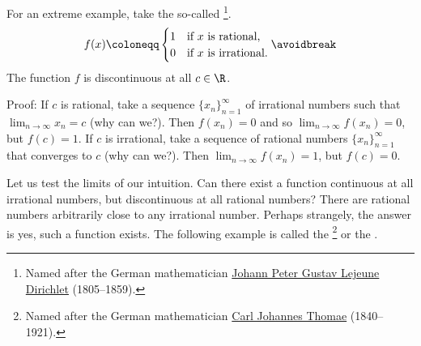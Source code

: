 \begin{example}
For an extreme example, take the so-called
\emph{}\footnote{Named after the German
mathematician
\href{https://en.wikipedia.org/wiki/Peter_Gustav_Lejeune_Dirichlet}{Johann Peter Gustav Lejeune
Dirichlet}
(1805--1859).}.
\begin{equation*}
f(x) \coloneqq
\begin{cases}
1 & \text{if } x \text{ is rational,} \\
0 & \text{if } x \text{ is irrational.}
\end{cases}
\avoidbreak
\end{equation*}
The function $f$ is discontinuous at all $c \in \R$.

Proof:
If $c$ is rational, take a sequence $\{ x_n \}_{n=1}^\infty$
of irrational numbers such that $\lim_{n\to\infty} x_n = c$ (why can we?).  Then $f(x_n) = 0$
and so $\lim_{n\to\infty} f(x_n) = 0$, but $f(c) = 1$.
If $c$ is irrational, take a sequence of rational numbers
$\{ x_n \}_{n=1}^\infty$
that converges to $c$ (why can we?).  Then $\lim_{n\to\infty} f(x_n) = 1$, but $f(c) = 0$.
\end{example}

Let us test the limits of our intuition.  Can
there exist a function continuous at all irrational numbers, but
discontinuous at all rational numbers?  There are rational numbers
arbitrarily close to any irrational number.  Perhaps strangely, the
answer is yes, such a function exists.  The following example is called the
\emph{}\footnote{Named after the German
mathematician
\href{https://en.wikipedia.org/wiki/Carl_Johannes_Thomae}{Carl Johannes Thomae}
(1840--1921).} or the
\emph{}.


